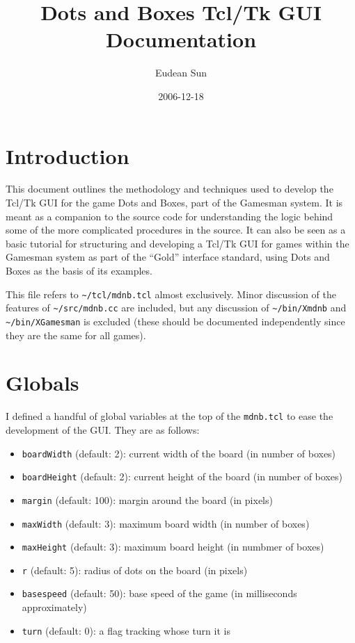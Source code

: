 \documentclass{article}
\title{Dots and Boxes Tcl/Tk GUI Documentation}
\author{Eudean Sun}
\date{2006-12-18}
\begin{document}
\maketitle
\tableofcontents
\pagebreak


\section{Introduction}

This document outlines the methodology and techniques used to develop the Tcl/Tk GUI for the game Dots and Boxes, part of the Gamesman system. It is meant as a companion to the source code for understanding the logic behind some of the more complicated procedures in the source. It can also be seen as a basic tutorial for structuring and developing a Tcl/Tk GUI for games within the Gamesman system as part of the ``Gold'' interface standard, using Dots and Boxes as the basis of its examples.

This file refers to \verb|~/tcl/mdnb.tcl| almost exclusively. Minor discussion of the features of \verb|~/src/mdnb.cc| are included, but any discussion of \verb|~/bin/Xmdnb| and \verb|~/bin/XGamesman| is excluded (these should be documented independently since they are the same for all games).


\section{Globals}

I defined a handful of global variables at the top of the \texttt{mdnb.tcl} to ease the development of the GUI. They are as follows:
\begin{itemize}
	\item \texttt{boardWidth} (default: 2): current width of the board (in number of boxes)
	\item \texttt{boardHeight} (default: 2): current height of the board (in number of boxes)
	\item \texttt{margin} (default: 100): margin around the board (in pixels)
	\item \texttt{maxWidth} (default: 3): maximum board width (in number of boxes)
	\item \texttt{maxHeight} (default: 3): maximum board height (in numbmer of boxes)
	\item \texttt{r} (default: 5): radius of dots on the board (in pixels)
	\item \texttt{basespeed} (default: 50): base speed of the game (in milliseconds approximately)
	\item \texttt{turn} (default: 0): a flag tracking whose turn it is
\end{itemize}
\end{document}
